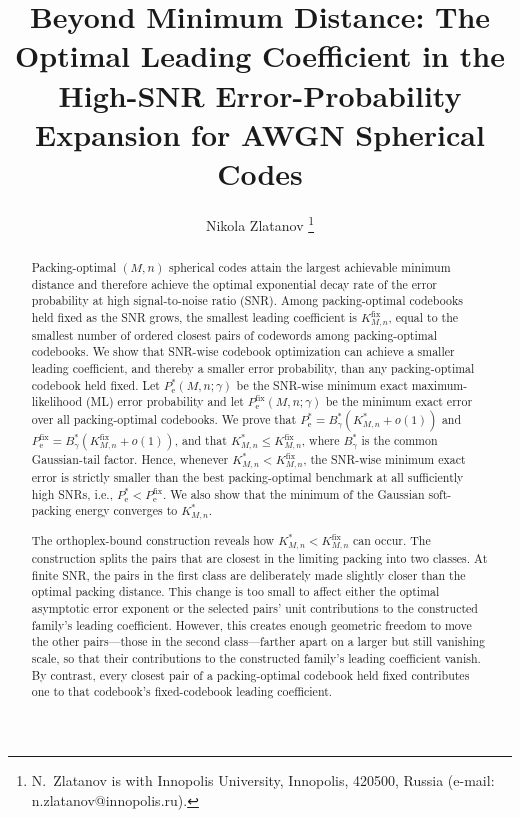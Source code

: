 \documentclass[12pt,draftclsnofoot,onecolumn]{IEEEtran}
\title{Beyond Minimum Distance: The Optimal Leading Coefficient in the High-SNR Error-Probability Expansion for AWGN Spherical Codes}
\author{Nikola Zlatanov
\thanks{N.~Zlatanov is with Innopolis University, Innopolis, 420500, Russia (e-mail: n.zlatanov@innopolis.ru).}
}
\newcommand{\Pe}{P_{\mathrm e}}
\theoremstyle{definition}
\begin{document}
\maketitle



\begin{abstract}
 Packing-optimal \((M,n)\) spherical codes attain the largest achievable minimum distance and therefore achieve the optimal exponential decay rate of the error probability at high signal-to-noise ratio (SNR). Among packing-optimal codebooks held fixed as the SNR grows, the smallest leading coefficient is
\(K^{\mathrm{fix}}_{M,n}\), equal to the smallest number of ordered closest pairs of codewords among packing-optimal codebooks.  We show that SNR-wise codebook optimization
can achieve a smaller leading coefficient, and thereby a smaller error
probability, than any packing-optimal codebook held fixed.
Let \(\Pe^{\ast}(M,n;\gamma)\) be the SNR-wise minimum exact
maximum-likelihood (ML) error probability and
let \(\Pe^{\mathrm{fix}}(M,n;\gamma)\) be the minimum exact error over all
packing-optimal codebooks.  We prove that
\(\Pe^{\ast}=B_\gamma^{\ast}(K^{\ast}_{M,n}+o(1))\) and
\(\Pe^{\mathrm{fix}}
=B_\gamma^{\ast}(K^{\mathrm{fix}}_{M,n}+o(1))\),  and that \(K^{\ast}_{M,n}\leq K^{\mathrm{fix}}_{M,n}\), where
\(B_\gamma^{\ast}\) is the common Gaussian-tail factor.   Hence, whenever
\(K^{\ast}_{M,n}<K^{\mathrm{fix}}_{M,n}\), the SNR-wise minimum exact
error is strictly smaller than the best packing-optimal
benchmark at all sufficiently high SNRs, i.e., \(\Pe^{\ast}<\Pe^{\mathrm{fix}}\).
We also show that the minimum of the Gaussian soft-packing energy converges to \(K^{\ast}_{M,n}\).


The orthoplex-bound construction reveals how
\(K^{\ast}_{M,n}<K^{\mathrm{fix}}_{M,n}\) can occur.  The construction
splits the pairs that are closest in the limiting packing into two
classes.  At finite SNR, the pairs in the first class are deliberately made slightly closer than the optimal packing
distance. This change is too small to affect either the optimal asymptotic
error exponent or the selected pairs' unit contributions to the constructed
family's leading coefficient. However, this creates enough geometric freedom to move the other pairs---those in the second class---farther apart
on a larger but still vanishing scale, so that
their contributions to the constructed family's leading coefficient
vanish.  By contrast, every
closest pair of a packing-optimal codebook held fixed contributes one to
that codebook's fixed-codebook leading coefficient.


\end{abstract}
\end{document}
